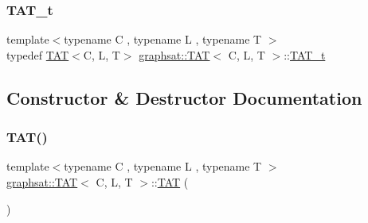 \mbox{\label{classgraphsat_1_1_t_a_t_a680323f63f58b3cb8e788d8e9ed65e16}} 
\subsubsection{\texorpdfstring{TAT\_t}{TAT\_t}}
{\footnotesize\ttfamily template$<$typename C , typename L , typename T $>$ \\
typedef \mbox{\hyperlink{classgraphsat_1_1_t_a_t}{T\+AT}}$<$C, L, T$>$ \mbox{\hyperlink{classgraphsat_1_1_t_a_t}{graphsat\+::\+T\+AT}}$<$ C, L, T $>$\+::\mbox{\hyperlink{classgraphsat_1_1_t_a_t_a680323f63f58b3cb8e788d8e9ed65e16}{T\+A\+T\+\_\+t}}\hspace{0.3cm}{\ttfamily [private]}}



\subsection{Constructor \& Destructor Documentation}
\mbox{\label{classgraphsat_1_1_t_a_t_ae7843fd71a81d950f51df613609d2bff}} 
\subsubsection{\texorpdfstring{TAT()}{TAT()}\hspace{0.1cm}{\footnotesize\ttfamily [1/3]}}
{\footnotesize\ttfamily template$<$typename C , typename L , typename T $>$ \\
\mbox{\hyperlink{classgraphsat_1_1_t_a_t}{graphsat\+::\+T\+AT}}$<$ C, L, T $>$\+::\mbox{\hyperlink{classgraphsat_1_1_t_a_t}{T\+AT}} (\begin{DoxyParamCaption}{ }\end{DoxyParamCaption})\hspace{0.3cm}{\ttfamily [inline]}}

\mbox{\label{classgraphsat_1_1_t_a_t_a23534f2a60ceeebba0ef0789c305a834}} 
